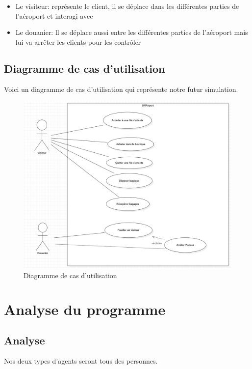 \documentclass[12pt,french]{article} %
\begin{document}
\begin{itemize}
	\item Le visiteur: représente le client, il se déplace dans les différentes parties de l'aéroport et interagi avec
	
	\item Le douanier: ll se déplace aussi entre les différentes parties de l'aéroport mais lui va arrêter les clients pour les contrôler
\end{itemize}

\subsection{Diagramme de cas d'utilisation}

Voici un diagramme de cas d'utilisation qui représente notre futur simulation.

\begin{figure}[H]
	\centering
	\includegraphics[scale=0.4]{usecase.png}
	\caption{Diagramme de cas d'utilisation}    
\end{figure}

\section{Analyse du programme}

\subsection{Analyse}

Nos deux types d'agents seront tous des personnes.
\end{document}
